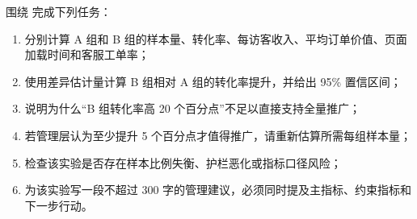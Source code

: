 \begin{exercise}
围绕  完成下列任务：
\begin{enumerate}
  \item 分别计算 A 组和 B 组的样本量、转化率、每访客收入、平均订单价值、页面加载时间和客服工单率；
  \item 使用差异估计量计算 B 组相对 A 组的转化率提升，并给出 95\% 置信区间；
  \item 说明为什么“B 组转化率高 20 个百分点”不足以直接支持全量推广；
  \item 若管理层认为至少提升 5 个百分点才值得推广，请重新估算所需每组样本量；
  \item 检查该实验是否存在样本比例失衡、护栏恶化或指标口径风险；
  \item 为该实验写一段不超过 300 字的管理建议，必须同时提及主指标、约束指标和下一步行动。
\end{enumerate}
\end{exercise}
